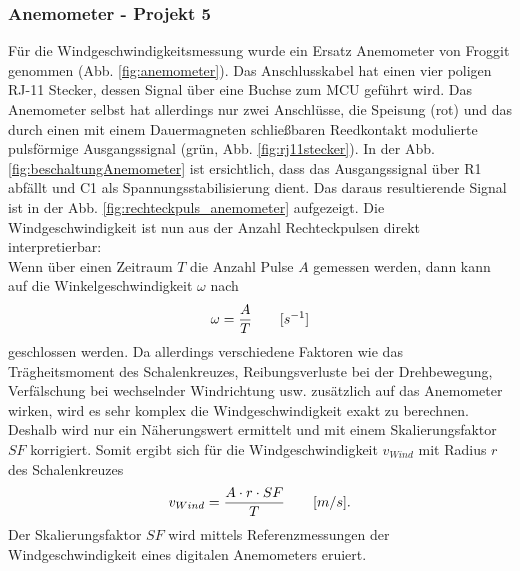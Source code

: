 \subsubsection{Anemometer - Projekt 5}
{\begin{minipage}[b][650pt][t]{0.55\textwidth}
Für die Windgeschwindigkeitsmessung wurde ein Ersatz Anemometer von Froggit genommen (Abb. \ref{fig:anemometer}). Das Anschlusskabel hat einen vier poligen RJ-11 Stecker, dessen Signal über eine Buchse zum MCU geführt wird. Das Anemometer selbst hat allerdings nur zwei Anschlüsse, die Speisung (rot) und das durch einen mit einem Dauermagneten schließbaren Reedkontakt modulierte pulsförmige Ausgangssignal (grün, Abb. \ref{fig:rj11stecker}). In der Abb. \ref{fig:beschaltungAnemometer} ist ersichtlich, dass das Ausgangssignal über R1 abfällt und C1 als Spannungsstabilisierung dient. Das daraus resultierende Signal ist in der Abb. \ref{fig:rechteckpuls_anemometer} aufgezeigt. Die Windgeschwindigkeit ist nun aus der Anzahl Rechteckpulsen direkt interpretierbar:\\

Wenn über einen Zeitraum $T$ die Anzahl Pulse $A$ gemessen werden, dann kann auf die Winkelgeschwindigkeit $\omega$ nach 
\begin{equation}
\centering
\omega=\frac{A}{T}\qquad[s^{-1}]
\end{equation}
geschlossen werden. Da allerdings verschiedene Faktoren wie das Trägheitsmoment des Schalenkreuzes, Reibungsverluste bei der Drehbewegung, Verfälschung bei wechselnder Windrichtung usw. zusätzlich auf das Anemometer wirken, wird es sehr komplex die Windgeschwindigkeit exakt zu berechnen. Deshalb wird nur ein Näherungswert ermittelt und mit einem Skalierungsfaktor $SF$ korrigiert. Somit ergibt sich für die Windgeschwindigkeit $v_{Wind}$ mit Radius $r$ des Schalenkreuzes
\begin{equation}
\centering
v_{Wind} = \frac{A\cdot r\cdot SF}{T}\qquad[m/s].
\label{equ:berechnungWindgeschwindigkeit}
\end{equation}
Der Skalierungsfaktor $SF$ wird mittels Referenzmessungen der Windgeschwindigkeit eines digitalen Anemometers eruiert. \\
\end{minipage}}
